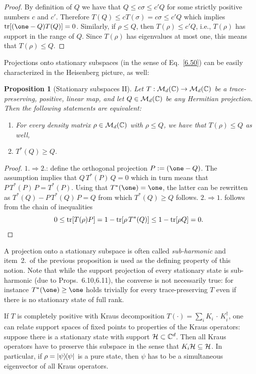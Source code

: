 \documentclass[11pt,a4paper]{article}
\theoremstyle{plain}
\newtheorem{proposition}{Proposition}[section]
\theoremstyle{definition}
\theoremstyle{remark}
\begin{document}
\begin{proof}
    By definition of $Q$ we have that $Q\le c\sigma\le c'Q$ for some strictly positive
    numbers $c$ and $c'$. Therefore $T(Q)\le cT(\sigma)=c\sigma\le c'Q$ which implies
    $\tr[(\one-Q)T(Q)]=0$. Similarly, if $\rho\le Q$, then $T(\rho)\le c'Q$, i.e.,
    $T(\rho)$ has support in the range of $Q$. Since $T(\rho)$ has eigenvalues at most
    one, this means that $T(\rho)\le Q$.
\end{proof}

Projections onto stationary subspaces (in the sense of Eq.~\eqref{6.50}) can be
easily characterized in the Heisenberg picture, as well:

\begin{proposition}[Stationary subspaces II]
    Let $T:\mathcal{M}_d(\mathbb{C})\to\mathcal{M}_d(\mathbb{C})$ be a trace-preserving, positive, linear map, and
    let $Q\in\mathcal{M}_d(\mathbb{C})$ be any Hermitian projection. Then the following statements
    are equivalent:
    \begin{enumerate}
        \item For every density matrix $\rho\in\mathcal{M}_d(\mathbb{C})$ with $\rho\le Q$, we have that
              $T(\rho)\le Q$ as well,
        \item $T^*(Q)\ge Q$.
    \end{enumerate}
\end{proposition}

\begin{proof}
    $1.\Rightarrow 2$.: define the orthogonal projection $P:=(\one-Q)$. The assumption
    implies that $Q\,T^*(P)\,Q=0$ which in turn means that $P\,T^*(P)\,P=T^*(P)$. Using
    that $T^*(\one)=\one$, the latter can be rewritten as $T^*(Q)-P\,T^*(Q)\,P=Q$ from
    which $T^*(Q)\ge Q$ follows.
    $2.\Rightarrow 1$. follows from the chain of inequalities
    \[
        0 \le \operatorname{tr}[T(\rho)P]
        = 1-\operatorname{tr}[\rho\,T^*(Q)]
        \le 1-\operatorname{tr}[\rho Q]
        = 0.
    \]
\end{proof}

A projection onto a stationary subspace is often called \emph{sub-harmonic} and
item~2.\ of the previous proposition is used as the defining property of this
notion. Note that while the support projection of every stationary state is
sub-harmonic (due to Props.~6.10,6.11), the converse is not necessarily true:
for instance $T^*(\one)\ge \one$ holds trivially for every trace-preserving $T$
even if there is no stationary state of full rank.

If $T$ is completely positive with Kraus decomposition
$T(\cdot)=\sum_i K_i\,\cdot\,K_i^\dagger$, one can relate support spaces of fixed
points to properties of the Kraus operators: suppose there is a stationary state
with support $\mathcal{H}\subset \mathbb{C}^d$. Then all Kraus operators have to preserve this
subspace in the sense that $K_i\mathcal{H}\subseteq \mathcal{H}$. In particular, if
$\rho=|\psi\rangle\!\langle\psi|$ is a pure state, then $\psi$ has to be a
simultaneous eigenvector of all Kraus operators.
\end{document}
